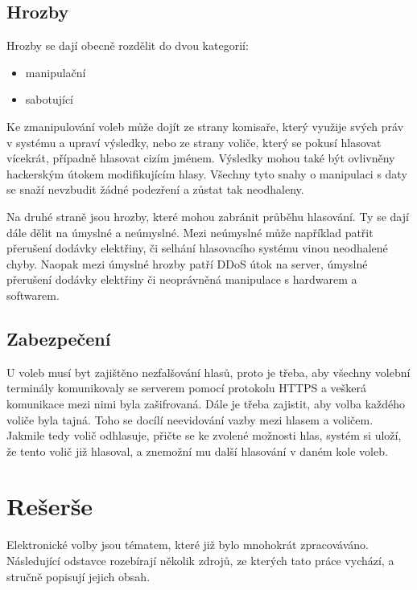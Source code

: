 \documentclass[11pt,twoside,a4paper]{book}
\begin{document}
\subsection{Hrozby}

Hrozby se dají obecně rozdělit do dvou kategorií: 

\begin{itemize}
	\item manipulační
	\item sabotující
\end{itemize}	

Ke zmanipulování voleb může dojít ze strany komisaře, který využije svých práv v systému a upraví výsledky, nebo ze strany voliče, který se pokusí hlasovat vícekrát, případně hlasovat cizím jménem. Výsledky mohou také být ovlivněny hackerským útokem modifikujícím hlasy. Všechny tyto snahy o manipulaci s daty se snaží nevzbudit žádné podezření a zůstat tak neodhaleny. 

Na druhé straně jsou hrozby, které mohou zabránit průběhu hlasování. Ty se dají dále dělit na úmyslné a neúmyslné. Mezi neúmyslné může například patřit přerušení dodávky elektřiny, či selhání hlasovacího systému vinou neodhalené chyby. Naopak mezi úmyslné hrozby patří DDoS útok \cite{www:ddos} na server, úmyslné přerušení dodávky elektřiny či neoprávněná manipulace s hardwarem a softwarem.

\subsection{Zabezpečení}

U voleb musí byt zajištěno nezfalšování hlasů, proto je třeba, aby všechny volební terminály komunikovaly se serverem pomocí protokolu HTTPS a veškerá komunikace mezi nimi byla zašifrovaná. Dále je třeba zajistit, aby volba každého voliče byla tajná. Toho se docílí neevidování vazby mezi hlasem a voličem. Jakmile tedy volič odhlasuje, přičte se ke zvolené možnosti hlas, systém si uloží, že tento volič již hlasoval, a znemožní mu další hlasování v daném kole voleb.

\section{Rešerše} 

Elektronické volby jsou tématem, které již bylo mnohokrát zpracováváno. Následující odstavce rozebírají několik zdrojů, ze kterých tato práce vychází, a stručně popisují jejich obsah.
\end{document}
